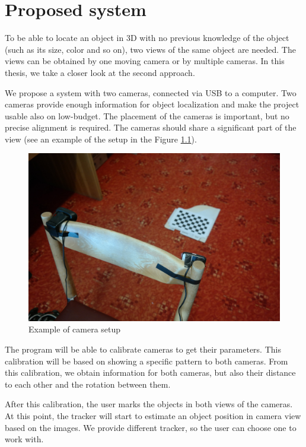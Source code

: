\chapter{Proposed system}

To be able to locate an object in 3D with no previous knowledge of the object (such
as its size, color and so on), two views of the same object are needed. The
views can be obtained by one moving camera or by multiple cameras. In this
thesis, we take a closer look at the second approach.

We propose a system with two cameras, connected via USB to a computer.
Two cameras provide enough information for object localization and make the
project usable also on low-budget. The placement of the cameras is important,
but no precise alignment is required. The cameras should share a significant part
of the view (see an example of the setup in the Figure \ref{fig:camera-setup}).

\begin{figure}
	\includegraphics[width=\linewidth]{img/camera-positions.jpg}
	\caption{Example of camera setup}
	\label{fig:camera-setup}
\end{figure}

The program will be able to calibrate cameras to get their parameters. This
calibration will be based on showing a specific pattern to both cameras. From
this calibration, we obtain information for both cameras, but also their
distance to each other and the rotation between them.

After this calibration, the user marks the objects in both views of the
cameras. At this point, the tracker will start to estimate an object position
in camera view based on the images. We provide different tracker, so the user
can choose one to work with.

